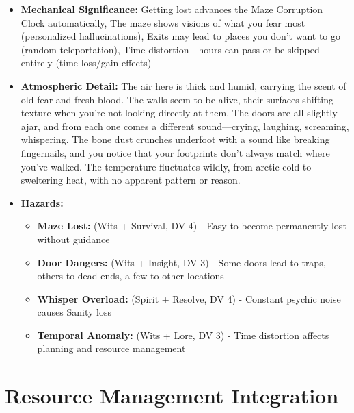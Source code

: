 \documentclass[11pt]{article}
\begin{document}
\begin{enumerate}
\begin{itemize}
  \item \textbf{Mechanical Significance:} Getting lost advances the Maze Corruption Clock automatically, The maze shows visions of what you fear most (personalized hallucinations), Exits may lead to places you don't want to go (random teleportation), Time distortion—hours can pass or be skipped entirely (time loss/gain effects)
  \item \textbf{Atmospheric Detail:} The air here is thick and humid, carrying the scent of old fear and fresh blood. The walls seem to be alive, their surfaces shifting texture when you're not looking directly at them. The doors are all slightly ajar, and from each one comes a different sound—crying, laughing, screaming, whispering. The bone dust crunches underfoot with a sound like breaking fingernails, and you notice that your footprints don't always match where you've walked. The temperature fluctuates wildly, from arctic cold to sweltering heat, with no apparent pattern or reason.
  \item \textbf{Hazards:}
    \begin{itemize}
    \item \textbf{Maze Lost:} (Wits + Survival, DV 4) - Easy to become permanently lost without guidance
    \item \textbf{Door Dangers:} (Wits + Insight, DV 3) - Some doors lead to traps, others to dead ends, a few to other locations
    \item \textbf{Whisper Overload:} (Spirit + Resolve, DV 4) - Constant psychic noise causes Sanity loss
    \item \textbf{Temporal Anomaly:} (Wits + Lore, DV 3) - Time distortion affects planning and resource management
    \end{itemize}
  \end{itemize}
\end{enumerate}

\section{Resource Management Integration}
\end{document}
